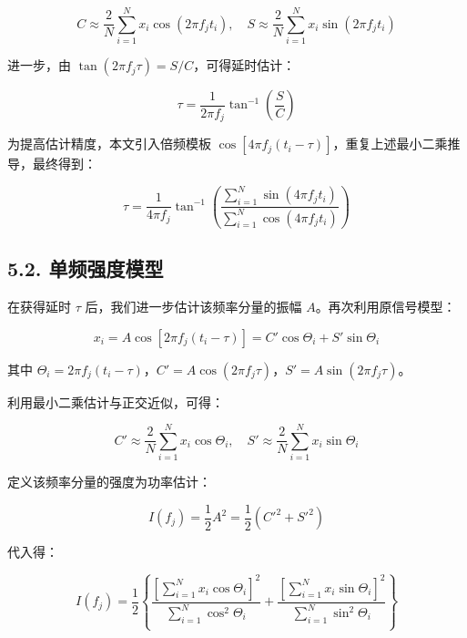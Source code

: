 \documentclass[withoutpreface,bwprint]{cumcmthesis}
\begin{document}
\begin{equation}
    C \approx \frac{2}{N} \sum_{i=1}^{N} x_i \cos(2\pi f_j t_i), \quad
S \approx \frac{2}{N} \sum_{i=1}^{N} x_i \sin(2\pi f_j t_i)
\end{equation}

进一步，由 $\tan(2\pi f_j \tau) = S / C$，可得延时估计：

\begin{equation}
    \tau = \frac{1}{2\pi f_j} \tan^{-1}\left( \frac{S}{C} \right)
\end{equation}

为提高估计精度，本文引入倍频模板 $\cos[4\pi f_j(t_i - \tau)]$，重复上述最小二乘推导，最终得到：

\begin{equation}
    \tau = \frac{1}{4\pi f_j} \tan^{-1}\left( \frac{\sum_{i=1}^{N} \sin(4\pi f_j t_i)}{\sum_{i=1}^{N} \cos(4\pi f_j t_i)} \right)
\end{equation}

\subsection*{5.2. 单频强度模型}

在获得延时 $\tau$ 后，我们进一步估计该频率分量的振幅 $A$。再次利用原信号模型：

\begin{equation}
    x_i = A \cos[2\pi f_j(t_i - \tau)] = C' \cos\Theta_i + S' \sin\Theta_i
\end{equation}

其中 $\Theta_i = 2\pi f_j(t_i - \tau)$，$C' = A \cos(2\pi f_j \tau)$，$S' = A \sin(2\pi f_j \tau)$。

利用最小二乘估计与正交近似，可得：

\begin{equation}
    C' \approx \frac{2}{N} \sum_{i=1}^{N} x_i \cos\Theta_i, \quad
S' \approx \frac{2}{N} \sum_{i=1}^{N} x_i \sin\Theta_i
\end{equation}

定义该频率分量的强度为功率估计：

\begin{equation}
    I(f_j) = \frac{1}{2} A^2 = \frac{1}{2}(C'^2 + S'^2)
\end{equation}

代入得：

\begin{equation}
    I(f_j) = \frac{1}{2} \left\{ \frac{\left[\sum_{i=1}^{N} x_i \cos\Theta_i\right]^2}{\sum_{i=1}^{N} \cos^2\Theta_i} + \frac{\left[\sum_{i=1}^{N} x_i \sin\Theta_i\right]^2}{\sum_{i=1}^{N} \sin^2\Theta_i} \right\}
\end{equation}
\end{document}
